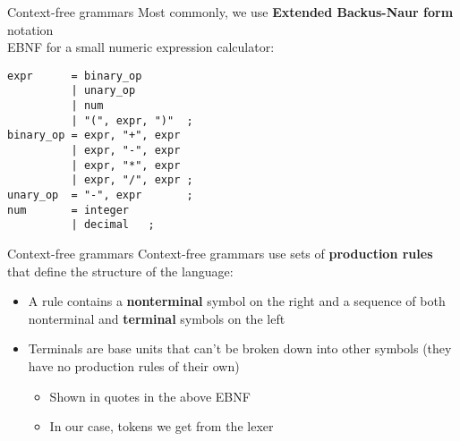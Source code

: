 \documentclass[../index.tex]{subfiles}
\begin{document}
\renewcommand{\currenttitle}{Context-free grammars}
\begin{frame}[fragile]{\currenttitle}
  \vspace*{1em}
  Most commonly, we use \textbf{Extended Backus-Naur form} notation \\[1.5em]

  EBNF for a small numeric expression calculator: \\[1em]

  \begin{lstlisting}[xleftmargin=2em]
expr      = binary_op
          | unary_op
          | num
          | "(", expr, ")"  ;
binary_op = expr, "+", expr
          | expr, "-", expr
          | expr, "*", expr
          | expr, "/", expr ;
unary_op  = "-", expr       ;
num       = integer
          | decimal   ;
  \end{lstlisting}
\end{frame}

\begin{frame}[fragile]{\currenttitle}
  Context-free grammars use sets of \textbf{production rules} that define the
  structure of the language:

  \only<+->
  \begin{itemize}
    \item<+-> A rule contains a \textbf{nonterminal} symbol on the right and a
      sequence of both nonterminal and \textbf{terminal} symbols on the left
    \item<+-> Terminals are base units that can't be broken down into other symbols
      (they have no production rules of their own)
      \begin{itemize}
        \item Shown in quotes in the above EBNF
        \item In our case, tokens we get from the lexer
      \end{itemize}
  \end{itemize}
\end{frame}
\end{document}
